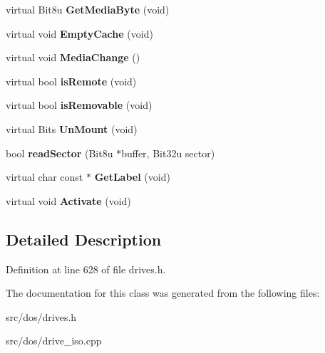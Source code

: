 \begin{DoxyCompactItemize}
\item 
\hypertarget{classisoDrive_aa6e11d3d3ef9179c7dde97199c03049a}{virtual Bit8u {\bfseries Get\-Media\-Byte} (void)}\label{classisoDrive_aa6e11d3d3ef9179c7dde97199c03049a}

\item 
\hypertarget{classisoDrive_a902191bc7beb70ecc14473dba805d409}{virtual void {\bfseries Empty\-Cache} (void)}\label{classisoDrive_a902191bc7beb70ecc14473dba805d409}

\item 
\hypertarget{classisoDrive_af2b985ba7bad0cb65c4fe0871a3d1b99}{virtual void {\bfseries Media\-Change} ()}\label{classisoDrive_af2b985ba7bad0cb65c4fe0871a3d1b99}

\item 
\hypertarget{classisoDrive_a3bf3c53009a3bd8ca3fe822d9ff2487d}{virtual bool {\bfseries is\-Remote} (void)}\label{classisoDrive_a3bf3c53009a3bd8ca3fe822d9ff2487d}

\item 
\hypertarget{classisoDrive_ab3a5c7695c171b7132ee2b8d08ebcd64}{virtual bool {\bfseries is\-Removable} (void)}\label{classisoDrive_ab3a5c7695c171b7132ee2b8d08ebcd64}

\item 
\hypertarget{classisoDrive_ad58ab0d475eec136f5738b4ac8d33136}{virtual Bits {\bfseries Un\-Mount} (void)}\label{classisoDrive_ad58ab0d475eec136f5738b4ac8d33136}

\item 
\hypertarget{classisoDrive_a4e6ef7d78f8bc93437a216f1b88b3d43}{bool {\bfseries read\-Sector} (Bit8u $\ast$buffer, Bit32u sector)}\label{classisoDrive_a4e6ef7d78f8bc93437a216f1b88b3d43}

\item 
\hypertarget{classisoDrive_acf1acbf5887b1d557589ea6eb1301a07}{virtual char const $\ast$ {\bfseries Get\-Label} (void)}\label{classisoDrive_acf1acbf5887b1d557589ea6eb1301a07}

\item 
\hypertarget{classisoDrive_a13b831240141955fb769a1d7b3dca700}{virtual void {\bfseries Activate} (void)}\label{classisoDrive_a13b831240141955fb769a1d7b3dca700}

\end{DoxyCompactItemize}


\subsection{Detailed Description}


Definition at line 628 of file drives.\-h.



The documentation for this class was generated from the following files\-:\begin{DoxyCompactItemize}
\item 
src/dos/drives.\-h\item 
src/dos/drive\-\_\-iso.\-cpp\end{DoxyCompactItemize}
